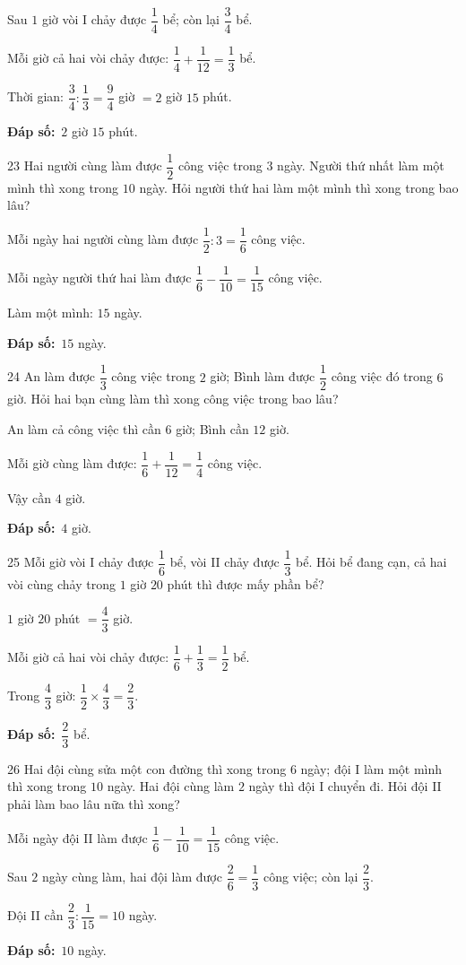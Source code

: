 \documentclass[11pt]{article}
\newif\ifsol \solfalse
\providecommand{\AnsWord}{Đáp số}
\newcommand{\dapso}[1]{\par\textbf{\AnsWord:}\ #1}
\newcommand{\probsol}[1]{%
  \begin{lrbox}{\solmeasure}\begin{minipage}{\dimexpr\linewidth-24pt\relax}#1\end{minipage}\end{lrbox}%
  \ifsol
    \begin{solbox}#1\end{solbox}%
  \else
    \setlength{\solht}{\dimexpr\ht\solmeasure+\dp\solmeasure+0.85cm\relax}%
    \ifdim\solht<1.35cm\setlength{\solht}{1.35cm}\fi
    \begin{tcolorbox}[colback=white,colframe=Line,boxrule=0.8pt,arc=5pt,
      left=8pt,right=8pt,top=4pt,bottom=4pt,height=\solht]{\footnotesize\color{Slate}\itshape\WorkWord}\end{tcolorbox}%
  \fi}
\newcommand{\gap}{\vspace{0.3cm}}
\def\WorkWord{Bài làm:}
\def\AnsWord{Đáp số}
\begin{document}
\probsol{
Sau $1$ giờ vòi I chảy được $\dfrac14$ bể; còn lại $\dfrac34$ bể.\par Mỗi giờ cả hai vòi chảy được: $\dfrac14+\dfrac1{12}=\dfrac13$ bể.\par Thời gian: $\dfrac34:\dfrac13=\dfrac94$ giờ $=2$ giờ $15$ phút.
\dapso{$2$ giờ $15$ phút.}}
\gap
\begin{probbox}{23}{\relax}
Hai người cùng làm được $\dfrac12$ công việc trong $3$ ngày. Người thứ nhất làm một mình thì xong trong $10$ ngày. Hỏi người thứ hai làm một mình thì xong trong bao lâu?
\end{probbox}
\probsol{
Mỗi ngày hai người cùng làm được $\dfrac12:3=\dfrac16$ công việc.\par Mỗi ngày người thứ hai làm được $\dfrac16-\dfrac1{10}=\dfrac1{15}$ công việc.\par Làm một mình: $15$ ngày.
\dapso{$15$ ngày.}}
\gap
\begin{probbox}{24}{\relax}
An làm được $\dfrac13$ công việc trong $2$ giờ; Bình làm được $\dfrac12$ công việc đó trong $6$ giờ. Hỏi hai bạn cùng làm thì xong công việc trong bao lâu?
\end{probbox}
\probsol{
An làm cả công việc thì cần $6$ giờ; Bình cần $12$ giờ.\par Mỗi giờ cùng làm được: $\dfrac16+\dfrac1{12}=\dfrac14$ công việc.\par Vậy cần $4$ giờ.
\dapso{$4$ giờ.}}
\gap
\begin{probbox}{25}{\relax}
Mỗi giờ vòi I chảy được $\dfrac16$ bể, vòi II chảy được $\dfrac13$ bể. Hỏi bể đang cạn, cả hai vòi cùng chảy trong $1$ giờ $20$ phút thì được mấy phần bể?
\end{probbox}
\probsol{
$1$ giờ $20$ phút $=\dfrac43$ giờ.\par Mỗi giờ cả hai vòi chảy được: $\dfrac16+\dfrac13=\dfrac12$ bể.\par Trong $\dfrac43$ giờ: $\dfrac12\times\dfrac43=\dfrac23$.
\dapso{$\dfrac23$ bể.}}
\gap
\begin{probbox}{26}{\relax}
Hai đội cùng sửa một con đường thì xong trong $6$ ngày; đội I làm một mình thì xong trong $10$ ngày. Hai đội cùng làm $2$ ngày thì đội I chuyển đi. Hỏi đội II phải làm bao lâu nữa thì xong?
\end{probbox}
\probsol{
Mỗi ngày đội II làm được $\dfrac16-\dfrac1{10}=\dfrac1{15}$ công việc.\par Sau $2$ ngày cùng làm, hai đội làm được $\dfrac26=\dfrac13$ công việc; còn lại $\dfrac23$.\par Đội II cần $\dfrac23:\dfrac1{15}=10$ ngày.
\dapso{$10$ ngày.}}
\end{document}
